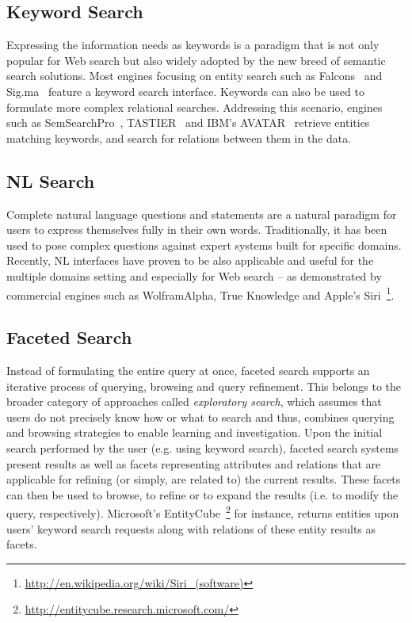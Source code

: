 \subsection{Keyword Search} Expressing the information needs as keywords is a paradigm that is not only popular for Web search but also widely adopted by the new breed of semantic search solutions. Most engines focusing on entity search such as Falcons~\cite{DBLP:journals/ijswis/ChengQ09} and Sig.ma~\cite{DBLP:journals/ws/TummarelloCCDDD10} feature a keyword search interface. Keywords can also be used to formulate more complex relational searches. Addressing this scenario, engines such as SemSearchPro~\cite{DBLP:journals/ws/TranHL11}, TASTIER~\cite{DBLP:conf/sigmod/LiJLF09} and IBM's AVATAR~\cite{DBLP:conf/sigmod/KandoganKRVZ06} retrieve entities matching keywords, and search for relations between them in the data. 
	
	
\subsection{NL Search} Complete natural language questions and statements are a natural paradigm for users to express themselves fully in their own words. Traditionally, it has been used to pose complex questions against expert systems built for specific domains. Recently, NL interfaces have proven to be also applicable and useful for the multiple domains setting and especially for Web search -- as demonstrated by commercial engines such as WolframAlpha, True Knowledge and Apple's Siri~\footnote{\url{http://en.wikipedia.org/wiki/Siri_(software)}}. 	
	

\subsection{Faceted Search} Instead of formulating the entire query at once, faceted search supports an iterative process of querying, browsing and query refinement. This belongs to the broader category of approaches called \emph{exploratory search}, which assumes that users do not precisely know how or what to search and thus, combines querying and browsing strategies to enable learning and investigation. Upon the initial search performed by the user (e.g. using keyword search), faceted search systems~\cite{DBLP:conf/dexa/WagnerLT11,DBLP:conf/esws/HeimEZ10} present results as well as facets representing attributes and relations that are applicable for refining (or simply, are related to) the current results. These facets can then be used to browse, to refine or to expand the results (i.e. to modify the query, respectively). Microsoft's EntityCube~\footnote{\url{http://entitycube.research.microsoft.com/}} for instance, returns entities upon users' keyword search requests along with relations of these entity results as facets. 

